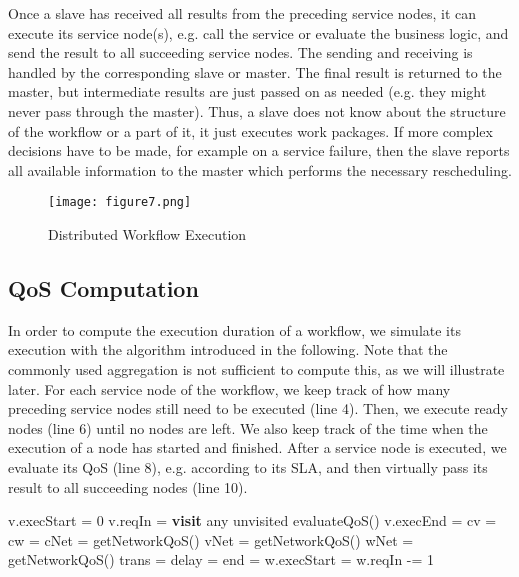 \documentclass[10pt, conference, compsocconf]{IEEEtran}
\newcommand{\oneImage}{3.2in}
\begin{document}
Once a slave has received all results from the preceding service nodes,
	it can execute its service node(s), e.g. call the service or evaluate the business logic,
		and send the result to all succeeding service nodes.
The sending and receiving is handled by the corresponding slave or master.
The final result is returned to the master,
	but intermediate results are just passed on as needed (e.g. they might never pass through the master).
Thus, a slave does not know about the structure of the workflow or a part of it, it just executes work packages.
If more complex decisions have to be made,
	for example on a service failure,
		then the slave reports all available information to the master
			which performs the necessary rescheduling.
      
\begin{figure}[hb!]
	\centering
	\texttt{[image: figure7.png]}
	\caption{Distributed Workflow Execution}
	\label{fig:workflow_execution}
\end{figure}

\subsection{QoS Computation}
\label{qos:formal}

\noindent In order to compute the execution duration of a workflow,
	we simulate its execution with the  algorithm
		introduced in the following.
Note that the commonly used aggregation is not sufficient to compute this,	as we will illustrate later.
For each service node of the workflow, we keep track of how many preceding service nodes still need to be executed (line 4).
Then, we execute ready nodes (line 6) until no nodes are left.
We also keep track of the time when the execution of a node has started and finished.
After a service node is executed, we evaluate its QoS (line 8), e.g. according to its SLA,
	and then virtually pass its result to all succeeding nodes (line 10).

\begin{algorithm}
	\label{algo:simulateExecution}
	\begin{algorithmic}[1]
				\State v.execStart = 0
				\State v.reqIn = 
			\EndFor
			\While{}
				\State \textbf{visit} any unvisited 
				\State evaluateQoS()
				\State v.execEnd = 
					\State cv = 
					\State cw = 
					\State cNet = getNetworkQoS()
					\State vNet = getNetworkQoS()
					\State wNet = getNetworkQoS()
					\State trans = 
					\State delay = 
					\State end = 
					\State w.execStart = 
					\State w.reqIn -= 1
				\EndFor
			\EndWhile
		\EndProcedure
	\end{algorithmic}
\end{algorithm}
\end{document}
